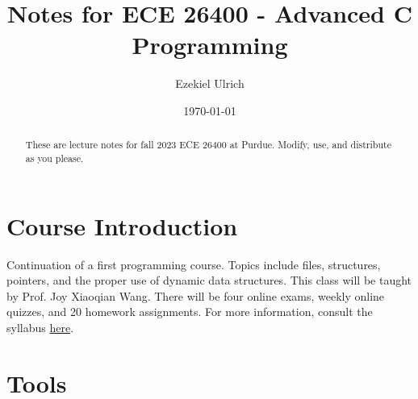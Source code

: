\documentclass[nobib]{tufte-handout}
\title{Notes for ECE 26400 - Advanced C Programming}
\author[Ezekiel Ulrich]{Ezekiel Ulrich}
\date{\today}  %
\begin{document}
\maketitle

\begin{abstract}
These are lecture notes for fall 2023 ECE 26400 at Purdue. Modify, use, and distribute as you please.
\end{abstract}

\tableofcontents


\section{Course Introduction}
Continuation of a first programming course. 
Topics include files, structures, pointers, and the proper use of dynamic data structures.
This class will be taught by Prof. Joy Xiaoqian Wang. There will be four online exams, 
weekly online quizzes, and 20 homework assignments. For more information, 
consult the syllabus \href{https://github.com/ezekielulrich/Notes/blob/d83855d25b40c224ce70b0b46ae6a86adc5a783f/ECE%20264%20Fall%202023%20Syllabus.pdf}{here}.

\pagebreak

\section{Tools}
\end{document}
